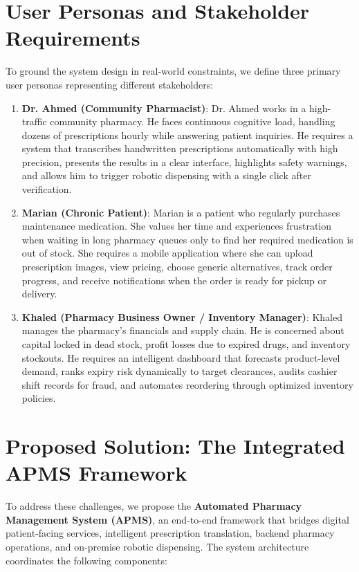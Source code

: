 \documentclass[12pt,a4paper,oneside]{report}
\begin{document}
\section{User Personas and Stakeholder
Requirements}\label{user-personas-and-stakeholder-requirements}

To ground the system design in real-world constraints, we define three
primary user personas representing different stakeholders:

\begin{enumerate}
\def\labelenumi{\arabic{enumi})}
\item
  \textbf{Dr. Ahmed (Community Pharmacist)}: Dr. Ahmed works in a
  high-traffic community pharmacy. He faces continuous cognitive load,
  handling dozens of prescriptions hourly while answering patient
  inquiries. He requires a system that transcribes handwritten
  prescriptions automatically with high precision, presents the results
  in a clear interface, highlights safety warnings, and allows him to
  trigger robotic dispensing with a single click after verification.
\item
  \textbf{Marian (Chronic Patient)}: Marian is a patient who regularly
  purchases maintenance medication. She values her time and experiences
  frustration when waiting in long pharmacy queues only to find her
  required medication is out of stock. She requires a mobile application
  where she can upload prescription images, view pricing, choose generic
  alternatives, track order progress, and receive notifications when the
  order is ready for pickup or delivery.
\item
  \textbf{Khaled (Pharmacy Business Owner / Inventory Manager)}: Khaled
  manages the pharmacy's financials and supply chain. He is concerned
  about capital locked in dead stock, profit losses due to expired
  drugs, and inventory stockouts. He requires an intelligent dashboard
  that forecasts product-level demand, ranks expiry risk dynamically to
  target clearances, audits cashier shift records for fraud, and
  automates reordering through optimized inventory policies.
\end{enumerate}

\section{Proposed Solution: The Integrated APMS
Framework}\label{proposed-solution-the-integrated-apms-framework}

To address these challenges, we propose the \textbf{Automated Pharmacy
Management System (APMS)}, an end-to-end framework that bridges digital
patient-facing services, intelligent prescription translation, backend
pharmacy operations, and on-premise robotic dispensing. The system
architecture coordinates the following components:
\end{document}
